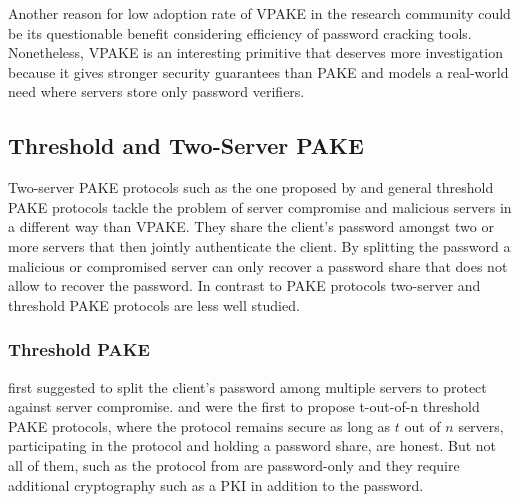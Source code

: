 Another reason for low adoption rate of \ac{VPAKE} in the research community could be its questionable benefit considering efficiency of password cracking tools.
Nonetheless, \ac{VPAKE} is an interesting primitive that deserves more investigation because it gives stronger security guarantees than \ac{PAKE} and models a real-world need where servers store only password verifiers.


\subsection{Threshold and Two-Server PAKE}
Two-server PAKE protocols such as the one proposed by \citet{Abdalla2005} and general threshold \ac{PAKE} protocols \cite{MacKenzieSJ02,RaimondoG03,Abdalla2005b} tackle the problem of server compromise and malicious servers in a different way than \ac{VPAKE}.
They share the client's password amongst two or more servers that then jointly authenticate the client.
By splitting the password a malicious or compromised server can only recover a password share that does not allow to recover the password.
In contrast to \ac{PAKE} protocols two-server and threshold \ac{PAKE} protocols are less well studied.

\subsubsection{Threshold PAKE}
\citet{FordK00} first suggested to split the client's password among multiple servers to protect against server compromise.
\citet{RaimondoG03} and \citet{MacKenzieSJ02} were the first to propose t-out-of-n threshold \ac{PAKE} protocols, where the protocol remains secure as long as $t$ out of $n$ servers, participating in the protocol and holding a password share, are honest.
But not all of them, such as the protocol from \citet{MacKenzieSJ02} are password-only and they require additional cryptography such as a \ac{PKI} in addition to the password.

